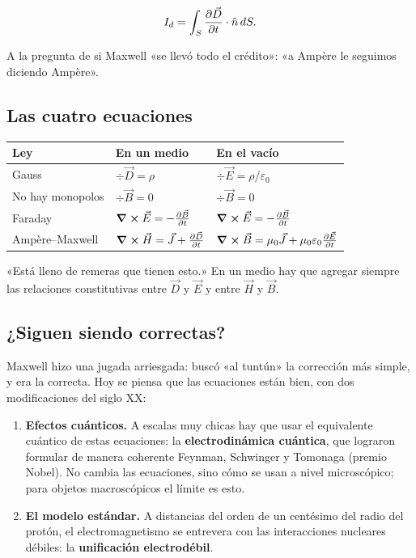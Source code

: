 \documentclass[12pt,a4paper]{article}
\begin{document}
\[
I_d = \int_S \pdv{\vec D}{t}\cdot\hat n\,dS .
\]

\begin{notebox}
A la pregunta de si Maxwell «se llevó todo el crédito»: «a Ampère le seguimos
diciendo Ampère».
\end{notebox}

\subsection{Las cuatro ecuaciones}

\begin{center}
\renewcommand{\arraystretch}{1.35}
\small
\begin{tabularx}{\textwidth}{l>{\raggedright\arraybackslash}X>{\raggedright\arraybackslash}X}
\toprule
\textbf{Ley} & \textbf{En un medio} & \textbf{En el vacío} \\
\midrule
Gauss & $\div\vec D = \rho$ & $\div\vec E = \rho/\varepsilon_0$ \\
No hay monopolos & $\div\vec B = 0$ & $\div\vec B = 0$ \\
Faraday & $\curl\vec E = -\pdv{\vec B}{t}$ & $\curl\vec E = -\pdv{\vec B}{t}$ \\
Ampère--Maxwell & $\curl\vec H = \vec J + \pdv{\vec D}{t}$ & $\curl\vec B = \mu_0\vec J + \mu_0\varepsilon_0\pdv{\vec E}{t}$ \\
\bottomrule
\end{tabularx}
\end{center}

«Está lleno de remeras que tienen esto.» En un medio hay que agregar siempre
las relaciones constitutivas entre $\vec D$ y $\vec E$ y entre $\vec H$ y
$\vec B$.

\subsection{¿Siguen siendo correctas?}

Maxwell hizo una jugada arriesgada: buscó «al tuntún» la corrección más simple,
y era la correcta. Hoy se piensa que las ecuaciones están bien, con dos
modificaciones del siglo XX:

\begin{enumerate}
  \item \textbf{Efectos cuánticos.} A escalas muy chicas hay que usar el equivalente
  cuántico de estas ecuaciones: la \textbf{electrodinámica cuántica}, que lograron
  formular de manera coherente Feynman, Schwinger y Tomonaga (premio Nobel).
  No cambia las ecuaciones, sino cómo se usan a nivel microscópico; para
  objetos macroscópicos el límite es esto.
  \item \textbf{El modelo estándar.} A distancias del orden de un centésimo del radio del
  protón, el electromagnetismo se entrevera con las interacciones nucleares
  débiles: la \textbf{unificación electrodébil}.
\end{enumerate}
\end{document}
